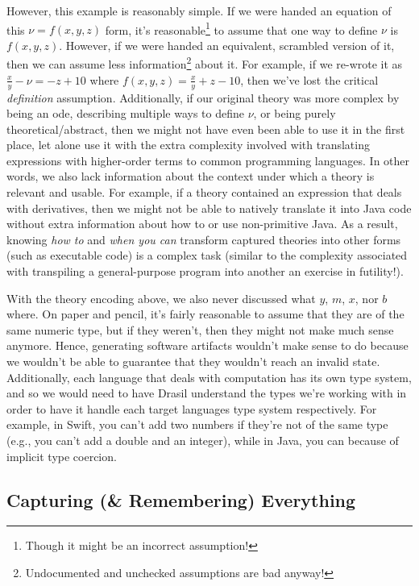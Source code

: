 However, this example is reasonably simple. If we were handed an equation of
this \(\nu{} = f(x,y,z)\) form, it's reasonable\footnote{Though it might be an
      incorrect assumption!} to assume that one way to define \(\nu{}\) is
\(f(x,y,z)\). However, if we were handed an equivalent, scrambled version of it,
then we can assume less information\footnote{Undocumented and unchecked
      assumptions are bad anyway!} about it. For example, if we re-wrote it as
\(\frac{x}{y} - \nu{} = - z + 10\) where \(f(x,y,z) = \frac{x}{y} + z - 10\),
then we've lost the critical \textit{definition} assumption. Additionally, if
our original theory was more complex by being an \acs{ode}, describing multiple
ways to define \(\nu{}\), or being purely theoretical/abstract, then we might
not have even been able to use it in the first place, let alone use it with the
extra complexity involved with translating expressions with higher-order terms
to common programming languages. In other words, we also lack information about
the context under which a theory is relevant and usable. For example, if a
theory contained an expression that deals with derivatives, then we might not be
able to natively translate it into Java code without extra information about how
to or use non-primitive Java. As a result, knowing \textit{how to} and
\textit{when you can} transform captured theories into other forms (such as
executable code) is a complex task (similar to the complexity associated with
transpiling a general-purpose program into another \textemdash{} an exercise in
futility!).

With the theory encoding above, we also never discussed what \(y\), \(m\),
\(x\), nor \(b\) where. On paper and pencil, it's fairly reasonable to assume
that they are of the same numeric type, but if they weren't, then they might not
make much sense anymore. Hence, generating software artifacts wouldn't make
sense to do because we wouldn't be able to guarantee that they wouldn't reach an
invalid state. Additionally, each language that deals with computation has its
own type system, and so we would need to have Drasil understand the types we're
working with in order to have it handle each target languages type system
respectively. For example, in Swift, you can't add two numbers if they're not of
the same type (e.g., you can't add a double and an integer), while in Java, you
can because of implicit type coercion.

\subsection{Capturing (\& Remembering) Everything}

